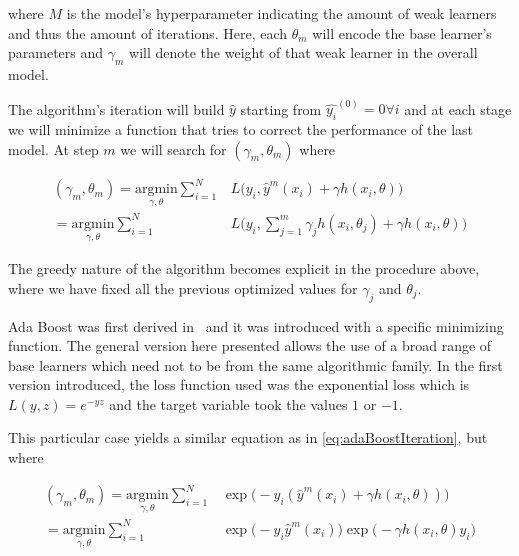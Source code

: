 where $M$ is the model's hyperparameter indicating the amount of weak learners and thus the amount of iterations. Here, each $\theta_m$ will encode the base learner's parameters and $\gamma_m$ will denote the weight of that weak learner in the overall model.

The algorithm's iteration will build $\hat{y}$ starting from $\hat{y_i}^{(0)}= 0 \forall i$ and at each stage we will minimize a function that tries to correct the performance of the last model. At step $m$ we will search for $(\gamma_{m}, \theta_{m})$ where

\begin{equation}\label{eq:adaBoostIteration}
\begin{split}
(\gamma_{m}, \theta_{m}) = \underset{\gamma, \theta}{\mathrm{argmin}} \sum_{i=1}^{N} & L\big( y_i,  \hat{y}^{m}(x_i) + \gamma h(x_i,\theta) \big) \\
= \underset{\gamma, \theta}{\mathrm{argmin}} \sum_{i=1}^{N} & L\big( y_i,  \sum_{j=1}^{m} \gamma_j h(x_i,\theta_j) + \gamma h(x_i,\theta) \big)
\end{split}
\end{equation}

The greedy nature of the algorithm becomes explicit in the procedure above, where we have fixed all the previous optimized values for $\gamma_j$ and $\theta_j$.

Ada Boost was first derived in~\cite{schapire-adaBoost} and it was introduced with a specific minimizing function. The general version here presented allows the use of a broad range of base learners which need not to be from the same algorithmic family. In the first version introduced, the loss function used was the exponential loss which is $L(y,z) = e^{-yz}$ and the target variable took the values $1$ or $-1$.

This particular case yields a similar equation as in \cref{eq:adaBoostIteration}, but where

\begin{equation}\label{eq:sadaBoostExponentialIteration}
\begin{split}
(\gamma_{m}, \theta_{m}) = \underset{\gamma, \theta}{\mathrm{argmin}} \sum_{i=1}^{N} & \exp\big( -y_i (\hat{y}^{m}(x_i) + \gamma h(x_i,\theta) )\big) \\
= \underset{\gamma, \theta}{\mathrm{argmin}} \sum_{i=1}^{N} &
\exp\big( -y_i \hat{y}^{m}(x_i)\big) \exp\big(- \gamma h(x_i,\theta)y_i \big)
\end{split}
\end{equation}


